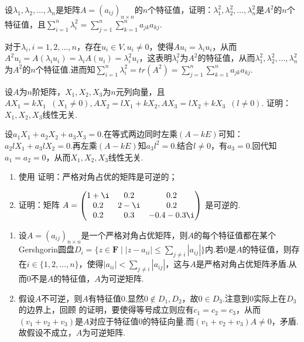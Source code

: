 \begin{exercise}
\begin{exgroup}
        \item 设$\lambda_1,\lambda_2,\ldots,\lambda_n$是矩阵$A=(a_{ij})_{n\times n}$的$n$个特征值，证明：$\lambda_1^2,\lambda_2^2,\ldots,\lambda_n^2$是$A^2$的$n$个特征值，且$\displaystyle\sum_{i=1}^{n}\lambda_i^2=\sum_{j=1}^{n}\displaystyle\sum_{k=1}^{n}a_{jk}a_{kj}$.
        \begin{answer}
            对于$\lambda_i,i=1,2,\ldots,n$，存在$u_i\in V,u_i\neq 0$，使得$Au_i=\lambda_iu_i$，从而$A^2u_i=A(\lambda_iu_i)=\lambda_iA(u_i)=\lambda_i^2u_i$，这表明$\lambda_i^2$为$A^2$的特征值，从而$\lambda_1^2,\lambda_2^2,\ldots,\lambda_n^2$为$A^2$的$n$个特征值.进而知$\displaystyle \sum_{i=1}^{n}\lambda_i^2=tr(A^2)=\sum_{j=1}^{n}\displaystyle\sum_{k=1}^{n}a_{jk}a_{kj}$.
        \end{answer}

        \item 设$A$为$n$阶矩阵，$X_1,X_2,X_3$为$n$元列向量，且$AX_1=kX_1\enspace(X_1\neq 0),AX_2=lX_1+kX_2,AX_3=lX_2+kX_3\enspace(l\neq 0)$. 证明：$X_1,X_2,X_3$线性无关.
        \begin{answer}
            设$a_1X_1+a_2X_2+a_3X_3=0$.在等式两边同时左乘$(A-kE)$可知：$a_2lX_1+a_3lX_2=0$.再左乘$(A-kE)$知$a_3l^2=0$.结合$l\neq 0$，有$a_3=0$.回代知$a_1=a_2=0$，从而$X_1,X_2,X_3$线性无关.
        \end{answer}

        \item \begin{enumerate}
            \item 使用 证明：严格对角占优的矩阵是可逆的；
            \item 证明：矩阵 $A = \begin{pmatrix}
                          1 + \i & 0.2    & 0.2          \\
                          0.2    & 2 - \i & 0.2          \\
                          0.2    & 0.3    & -0.4 - 0.3\i
                      \end{pmatrix}
                  $ 是可逆的.
        \end{enumerate}
        \begin{answer}
            \begin{enumerate}
                \item 设$A=(a_{ij})_{n\times n}$是一个严格对角占优矩阵，则$A$的每个特征值都在某个Gershgorin圆盘$D_i=\{z\in \mathbf{F}\mid|z-a_{ii}|\leqslant \displaystyle\sum_{j\neq i}|a_{ij}|\}$内.若$0$是$A$的特征值，则存在$i\in\{1,2,\ldots,n\}$，使得$|a_{ii}|<\displaystyle\sum_{j\neq i}|a_{ij}|$，这与$A$是严格对角占优矩阵矛盾.从而$0$不是$A$的特征值，$A$为可逆矩阵.
                \item 假设$A$不可逆，则$A$有特征值$0$.显然$0\notin D_1,D_2$，故$0\in D_3$.注意到$0$实际上在$D_3$的边界上，回顾 的证明，要使得等号成立则应有$c_1=c_2=c_3$，从而$(v_1+v_2+v_3)$是$A$对应于特征值$0$的特征向量.而$(v_1+v_2+v_3)A\neq 0$，矛盾.故假设不成立，$A$为可逆矩阵.
            \end{enumerate}
        \end{answer}
    \end{exgroup}


\end{exercise}
